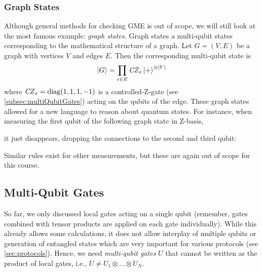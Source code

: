 			\subsubsection{Graph States}
				Although general methods for checking \ac{GME} is out of scope, we will still look at the most famous example: \emph{graph states.} Graph states a multi-qubit states corresponding to the mathematical structure of a graph. Let \( G = (V, E) \) be a graph with vertices \(V\) and edges \(E\). Then the corresponding multi-qubit state is
				\begin{equation}
					\ket{G} = \prod_{e \in E} \mathit{CZ}_e \ket{+}^{\otimes \lvert V \rvert}
				\end{equation}
				where \( \mathit{CZ}_e = \operatorname{diag}(1, 1, 1, -1) \) is a controlled-Z-gate (see \autoref{subsec:multiQubitGates}) acting on the qubits of the edge. These graph states allowed for a new language to reason about quantum states. For instance, when measuring the first qubit of the following graph state in Z-basis,
				\begin{center}
				\end{center}
				it just disappears, dropping the connections to the second and third qubit:
				\begin{center}
				\end{center}
				Similar rules exist for other measurements, but these are again out of scope for this course.

		\subsection{Multi-Qubit Gates}
			\label{subsec:multiQubitGates}

			So far, we only discussed local gates acting on a single qubit (remember, gates combined with tensor products are applied on each gate individually). While this already allows some calculations, it does not allow interplay of multiple qubits or generation of entangled states which are very important for various protocols (see \autoref{sec:protocols}). Hence, we need \emph{multi-qubit gates} \(U\) that cannot be written as the product of local gates, i.e., \( U \neq U_1 \otimes \dots \otimes U_N \).


